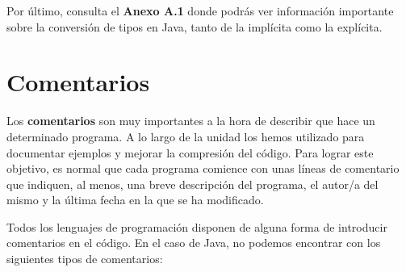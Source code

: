 Por último, consulta el \textbf{Anexo A.1} donde podrás ver información importante sobre la conversión de tipos en Java, tanto de la implícita como la explícita.

\section{Comentarios}
Los \textbf{comentarios} son muy importantes a la hora de describir que hace un determinado programa. A lo largo de la unidad los hemos utilizado para documentar ejemplos y mejorar la compresión del código. Para lograr este objetivo, es normal que cada programa comience con unas líneas de comentario que indiquen, al menos, una breve descripción del programa, el autor/a del mismo y la última fecha en la que se ha modificado.

Todos los lenguajes de programación disponen de alguna forma de introducir comentarios en el código. En el caso de Java, no podemos encontrar con los siguientes tipos de comentarios:

